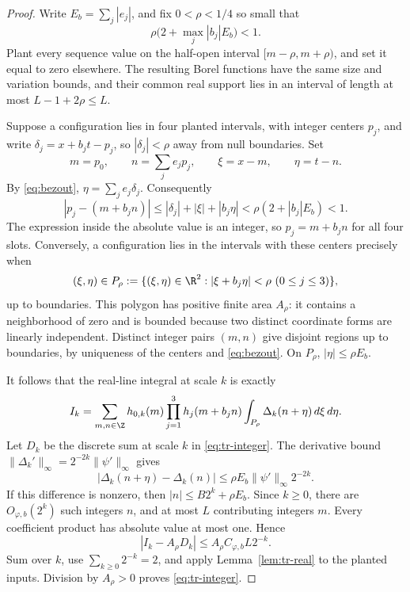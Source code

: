 \begin{proof}
Write \(E_b=\sum_j|e_j|\), and fix \(0<\rho<1/4\) so small that
\begin{equation}
 \rho\bigl(2+\max_j|b_j|E_b\bigr)<1.
 \label{eq:tr-radius}
\end{equation}
Plant every sequence value on the half-open interval
\([m-\rho,m+\rho)\), and set it equal to zero elsewhere.  The
resulting Borel functions have the same size and variation bounds,
and their common real support lies in an interval of length at most
\(L-1+2\rho\leq L\).

Suppose a configuration lies in four planted intervals, with integer
centers \(p_j\), and write
\(\delta_j=x+b_jt-p_j\), so \(|\delta_j|<\rho\) away from null
boundaries.  Set
\[
 m=p_0,\qquad n=\sum_je_jp_j,\qquad
 \xi=x-m,\qquad\eta=t-n.
\]
By \eqref{eq:bezout}, \(\eta=\sum_je_j\delta_j\).  Consequently
\[
 |p_j-(m+b_jn)|
 \leq |\delta_j|+|\xi|+|b_j\eta|
 <\rho(2+|b_j|E_b)<1.
\]
The expression inside the absolute value is an integer, so
\(p_j=m+b_jn\) for all four slots.  Conversely, a configuration
lies in the intervals with these centers precisely when
\[
 (\xi,\eta)\in P_\rho
 :=\{(\xi,\eta)\in\R^2:|\xi+b_j\eta|<\rho\ (0\leq j\leq3)\},
\]
up to boundaries.  This polygon has positive finite area
\(A_\rho\): it contains a neighborhood of zero and is bounded because
two distinct coordinate forms are linearly independent.  Distinct
integer pairs \((m,n)\) give disjoint regions up to boundaries,
by uniqueness of the centers and \eqref{eq:bezout}.  On
\(P_\rho\), \(|\eta|\leq\rho E_b\).

It follows that the real-line integral at scale \(k\) is exactly
\[
 I_k=\sum_{m,n\in\Z}h_{0,k}(m)\prod_{j=1}^3h_j(m+b_jn)
       \int_{P_\rho}\Delta_k(n+\eta)\,d\xi\,d\eta.
\]
Let \(D_k\) be the discrete sum at scale \(k\) in
\eqref{eq:tr-integer}.  The derivative bound
\(\|\Delta_k'\|_\infty=2^{-2k}\|\psi'\|_\infty\) gives
\[
 |\Delta_k(n+\eta)-\Delta_k(n)|
 \leq \rho E_b\|\psi'\|_\infty2^{-2k}.
\]
If this difference is nonzero, then
\(|n|\leq B2^k+\rho E_b\).  Since \(k\geq0\), there are
\(O_{\varphi,b}(2^k)\) such integers \(n\), and at most \(L\)
contributing integers \(m\).  Every coefficient product has absolute
value at most one.  Hence
\[
 |I_k-A_\rho D_k|\leq A_\rho C_{\varphi,b}L2^{-k}.
\]
Sum over \(k\), use \(\sum_{k\geq0}2^{-k}=2\), and apply
Lemma~\ref{lem:tr-real} to the planted inputs.  Division by
\(A_\rho>0\) proves \eqref{eq:tr-integer}.
\end{proof}

